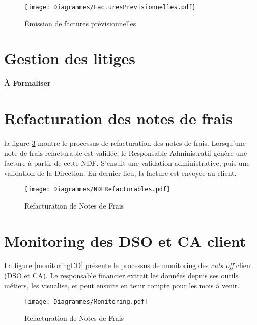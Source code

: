 \begin{figure}
	\centering
		\texttt{[image: Diagrammes/FacturesPrevisionnelles.pdf]}
	\caption{Émission de factures prévisionnelles}
	\label{validationFactures}	
\end{figure}


\section{Gestion des litiges}
\paragraph{À Formaliser}


\section{Refacturation des notes de frais}
\paragraph{} la figure \ref{NDFRefacturables} montre le processus de refacturation des notes de frais. Lorsqu'une note de frais refacturable est validée, le Responsable Administratif génère une facture à partir de cette NDF. S'ensuit une validation administrative, puis une validation de la Direction. En dernier lieu, la facture est envoyée au client.


\begin{figure}
	\centering
		\texttt{[image: Diagrammes/NDFRefacturables.pdf]}
	\caption{Refacturation de Notes de Frais}
	\label{NDFRefacturables}	
\end{figure}


\section{Monitoring des DSO et CA client}

\paragraph{} La figure \ref{monitoringCO} présente le processus de monitoring des \textit{cuts off} client (DSO et CA). Le responsable financier extrait les données depuis ses outils métiers, les visualise, et peut ensuite en tenir compte pour les mois à venir.


\begin{figure}
	\centering
		\texttt{[image: Diagrammes/Monitoring.pdf]}
	\caption{Refacturation de Notes de Frais}
	\label{NDFRefacturables}	
\end{figure}
